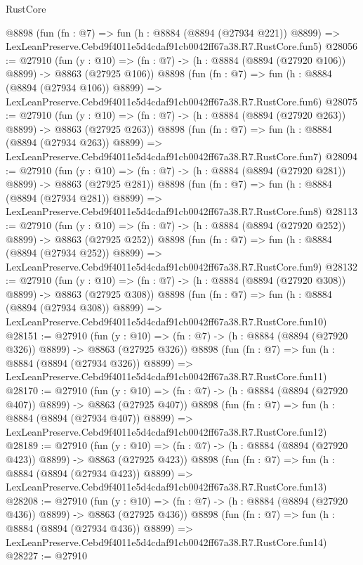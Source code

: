 \begin{lexlean}{RustCore}
\begin{coremodule}
    @8898
    (fun (fn : @7) =>
    fun (h : @8884 (@8894 (@27934 @221)) @8899) =>
    LexLeanPreserve.Cebd9f4011e5d4cdaf91cb0042ff67a38.R7.RustCore.fun5)
@28056 := @27910
    (fun (y : @10) => (fn : @7) -> (h : @8884 (@8894 (@27920 @106)) @8899) -> @8863 (@27925 @106))
    @8898
    (fun (fn : @7) =>
    fun (h : @8884 (@8894 (@27934 @106)) @8899) =>
    LexLeanPreserve.Cebd9f4011e5d4cdaf91cb0042ff67a38.R7.RustCore.fun6)
@28075 := @27910
    (fun (y : @10) => (fn : @7) -> (h : @8884 (@8894 (@27920 @263)) @8899) -> @8863 (@27925 @263))
    @8898
    (fun (fn : @7) =>
    fun (h : @8884 (@8894 (@27934 @263)) @8899) =>
    LexLeanPreserve.Cebd9f4011e5d4cdaf91cb0042ff67a38.R7.RustCore.fun7)
@28094 := @27910
    (fun (y : @10) => (fn : @7) -> (h : @8884 (@8894 (@27920 @281)) @8899) -> @8863 (@27925 @281))
    @8898
    (fun (fn : @7) =>
    fun (h : @8884 (@8894 (@27934 @281)) @8899) =>
    LexLeanPreserve.Cebd9f4011e5d4cdaf91cb0042ff67a38.R7.RustCore.fun8)
@28113 := @27910
    (fun (y : @10) => (fn : @7) -> (h : @8884 (@8894 (@27920 @252)) @8899) -> @8863 (@27925 @252))
    @8898
    (fun (fn : @7) =>
    fun (h : @8884 (@8894 (@27934 @252)) @8899) =>
    LexLeanPreserve.Cebd9f4011e5d4cdaf91cb0042ff67a38.R7.RustCore.fun9)
@28132 := @27910
    (fun (y : @10) => (fn : @7) -> (h : @8884 (@8894 (@27920 @308)) @8899) -> @8863 (@27925 @308))
    @8898
    (fun (fn : @7) =>
    fun (h : @8884 (@8894 (@27934 @308)) @8899) =>
    LexLeanPreserve.Cebd9f4011e5d4cdaf91cb0042ff67a38.R7.RustCore.fun10)
@28151 := @27910
    (fun (y : @10) => (fn : @7) -> (h : @8884 (@8894 (@27920 @326)) @8899) -> @8863 (@27925 @326))
    @8898
    (fun (fn : @7) =>
    fun (h : @8884 (@8894 (@27934 @326)) @8899) =>
    LexLeanPreserve.Cebd9f4011e5d4cdaf91cb0042ff67a38.R7.RustCore.fun11)
@28170 := @27910
    (fun (y : @10) => (fn : @7) -> (h : @8884 (@8894 (@27920 @407)) @8899) -> @8863 (@27925 @407))
    @8898
    (fun (fn : @7) =>
    fun (h : @8884 (@8894 (@27934 @407)) @8899) =>
    LexLeanPreserve.Cebd9f4011e5d4cdaf91cb0042ff67a38.R7.RustCore.fun12)
@28189 := @27910
    (fun (y : @10) => (fn : @7) -> (h : @8884 (@8894 (@27920 @423)) @8899) -> @8863 (@27925 @423))
    @8898
    (fun (fn : @7) =>
    fun (h : @8884 (@8894 (@27934 @423)) @8899) =>
    LexLeanPreserve.Cebd9f4011e5d4cdaf91cb0042ff67a38.R7.RustCore.fun13)
@28208 := @27910
    (fun (y : @10) => (fn : @7) -> (h : @8884 (@8894 (@27920 @436)) @8899) -> @8863 (@27925 @436))
    @8898
    (fun (fn : @7) =>
    fun (h : @8884 (@8894 (@27934 @436)) @8899) =>
    LexLeanPreserve.Cebd9f4011e5d4cdaf91cb0042ff67a38.R7.RustCore.fun14)
@28227 := @27910

\end{coremodule}
\end{lexlean}
